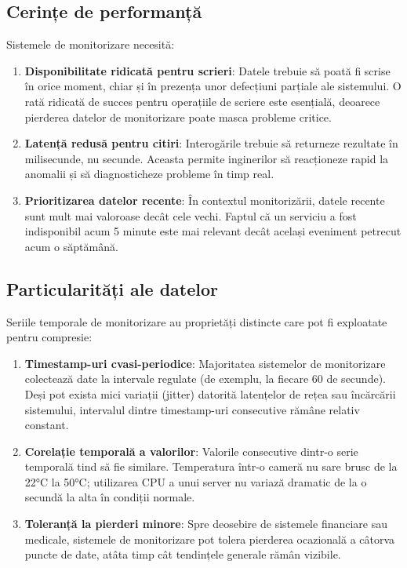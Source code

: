 \subsection{Cerințe de performanță}

Sistemele de monitorizare necesită:
\begin{enumerate}
    \item \textbf{Disponibilitate ridicată pentru scrieri}: Datele trebuie să poată fi scrise în orice moment, chiar și în prezența unor defecțiuni parțiale ale sistemului. O rată ridicată de succes pentru operațiile de scriere este esențială, deoarece pierderea datelor de monitorizare poate masca probleme critice.

    \item \textbf{Latență redusă pentru citiri}: Interogările trebuie să returneze rezultate în milisecunde, nu secunde. Aceasta permite inginerilor să reacționeze rapid la anomalii și să diagnosticheze probleme în timp real.

    \item \textbf{Prioritizarea datelor recente}: În contextul monitorizării, datele recente sunt mult mai valoroase decât cele vechi. Faptul că un serviciu a fost indisponibil acum 5 minute este mai relevant decât același eveniment petrecut acum o săptămână.
\end{enumerate}

\subsection{Particularități ale datelor}

Seriile temporale de monitorizare au proprietăți distincte care pot fi exploatate pentru compresie:

\begin{enumerate}
    \item \textbf{Timestamp-uri cvasi-periodice}: Majoritatea sistemelor de monitorizare colectează date la intervale regulate (de exemplu, la fiecare 60 de secunde). Deși pot exista mici variații (jitter) datorită latențelor de rețea sau încărcării sistemului, intervalul dintre timestamp-uri consecutive rămâne relativ constant.

    \item \textbf{Corelație temporală a valorilor}: Valorile consecutive dintr-o serie temporală tind să fie similare. Temperatura într-o cameră nu sare brusc de la 22°C la 50°C; utilizarea CPU a unui server nu variază dramatic de la o secundă la alta în condiții normale.

    \item \textbf{Toleranță la pierderi minore}: Spre deosebire de sistemele financiare sau medicale, sistemele de monitorizare pot tolera pierderea ocazională a câtorva puncte de date, atâta timp cât tendințele generale rămân vizibile.
\end{enumerate}

